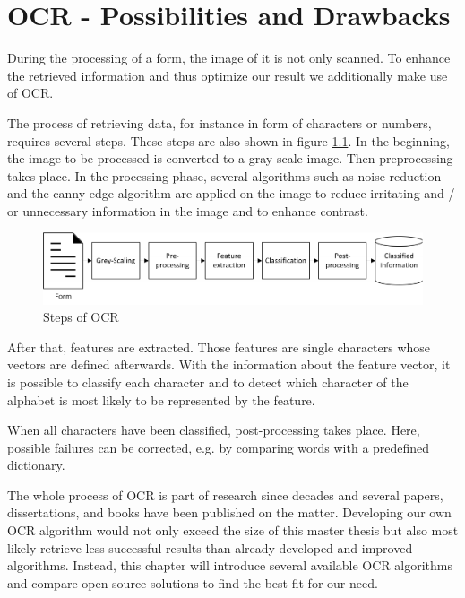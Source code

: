 %
% 
\chapter{OCR - Possibilities and Drawbacks}
\label{cha3}

During the processing of a form, the image of it is not only scanned. To enhance the retrieved information and thus optimize our result we additionally make use of OCR.

The process of retrieving data, for instance in form of characters or numbers, requires several steps. These steps are also shown in figure \ref{ocrSteps}. In the beginning, the image to be processed is converted to a gray-scale image. Then preprocessing takes place. In the processing phase, several algorithms such as noise-reduction and the canny-edge-algorithm are applied on the image to reduce irritating and / or unnecessary information in the image and to enhance contrast.

\begin{figure}[htbp!]
\centering
\includegraphics[scale=0.9,natwidth=173,natheight=33]{Images/OCR/Steps_Of_OCR.pdf}
\caption{Steps of OCR \label{ocrSteps}}
\end{figure}

After that, features are extracted. Those features are single characters whose vectors are defined afterwards. With the information about the feature vector, it is possible to classify each character and to detect which character of the alphabet is most likely to be represented by the feature.

When all characters have been classified, post-processing takes place. Here, possible failures can be corrected, e.g. by comparing words with a predefined dictionary.

The whole process of OCR is part of research since decades and several papers, dissertations, and books have been published on the matter\cite{impedovo91}\cite{Mori99}\cite{Wang15}. Developing our own OCR algorithm would not only exceed the size of this master thesis but also most likely retrieve less successful results than already developed and improved algorithms. Instead, this chapter will introduce several available OCR algorithms and compare open source solutions to find the best fit for our need.

